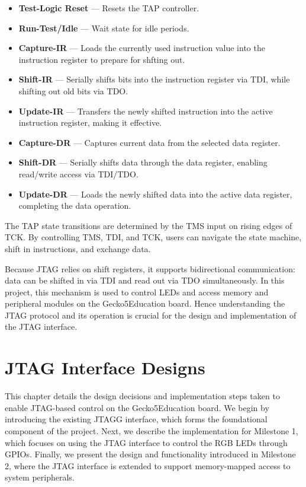 \documentclass[a4paper,11pt,oneside]{report}
\newcommand{\boardName}{Gecko5Education \xspace}
\begin{document}
\begin{itemize}
    \item \textbf{Test-Logic Reset} — Resets the TAP controller.  
    \item \textbf{Run-Test/Idle} — Wait state for idle periods.  

    \item \textbf{Capture-IR} — Loads the currently used instruction value into the instruction register to prepare for shfting out.
    \item \textbf{Shift-IR} — Serially shifts bits into the instruction register via TDI, while shifting out old bits via TDO.
    \item \textbf{Update-IR} — Transfers the newly shifted instruction into the active instruction register, making it effective.
    
    \item \textbf{Capture-DR} — Captures current data from the selected data register.
    \item \textbf{Shift-DR} — Serially shifts data through the data register, enabling read/write access via TDI/TDO.
    \item \textbf{Update-DR} — Loads the newly shifted data into the active data register, completing the data operation.
\end{itemize}

The TAP state transitions are determined by the TMS input on rising edges of TCK.  
By controlling TMS, TDI, and TCK, users can navigate the state machine,  
shift in instructions, and exchange data.  

Because JTAG relies on shift registers, it supports bidirectional communication:  
data can be shifted in via TDI and read out via TDO simultaneously.  
In this project, this mechanism is used to control LEDs  
and access memory and peripheral modules on the \boardName board.  
Hence understanding the JTAG protocol and its operation is crucial for the design and implementation of the JTAG interface.


\chapter{JTAG Interface Designs}

This chapter details the design decisions and implementation steps taken to enable JTAG-based control on the \boardName board.
We begin by introducing the existing JTAGG interface, which forms the foundational component of the project.
Next, we describe the implementation for Milestone 1, which focuses on using the JTAG interface to control the RGB LEDs through GPIOs.
Finally, we present the design and functionality introduced in Milestone 2, where the JTAG interface is extended to support memory-mapped access to system peripherals.
\end{document}
